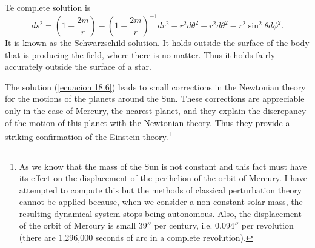 Te complete solution is
\begin{equation}
\label{ecuacion 18.6}
 ds^2 = \left( 1 - \frac{2 m }{r} \right)
 -  \left( 1 - \frac{2 m }{r} \right)^{-1} dr^2 - r^2 d\theta^2 - r^2 d\theta^2 - r^2 \sin^2 \theta d\phi^2.
\end{equation}
It is known as the Schwarzschild solution. It holds outside the surface of the body that is producing the field, where 
there is no matter. Thus it holds fairly accurately outside the surface of a star.

The solution (\ref{ecuacion 18.6}) leads to small corrections in the Newtonian theory for the motions of the planets 
around the Sun. These corrections are appreciable only in the case of Mercury, the nearest planet, and they explain the 
discrepancy of the motion of this planet with the Newtonian theory. Thus they provide a striking confirmation of the 
Einstein theory.\footnote{As we know that the mass of the Sun is not constant and this fact must have its effect on the 
displacement of the perihelion of the orbit of Mercury. I have attempted to compute this but the methods of classical 
perturbation theory cannot be applied because, when we consider a non constant solar mass, the resulting dynamical 
system stops being autonomous. Also, the displacement of the orbit of Mercury is small $39''$ per century, i.e. 
$0.094''$ per revolution (there are 1,296,000 seconds of arc in a complete revolution).} 







